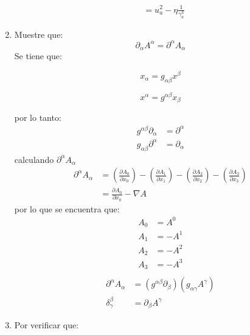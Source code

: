 \documentclass[12pt,letterpaper]{report}
\begin{document}
\begin{enumerate}
\begin{align*}
        & = u_a^2 - \eta \frac{1}{\gamma^3_a}
    \end{align*}
    \item Muestre que:
    \begin{equation*}
        \partial_\alpha A^\alpha = \partial^\alpha A_\alpha 
    \end{equation*}
    Se tiene que:\\
    \begin{minipage}{0.5\linewidth}
        \begin{equation*}
            x_\alpha = g_{\alpha \beta} x^\beta 
        \end{equation*}
    \end{minipage}
    \begin{minipage}{0.5\linewidth}
        \begin{equation*}
            x^\alpha = g^{\alpha \beta}x_\beta
        \end{equation*}
    \end{minipage}
    por lo tanto: 
    \begin{align*}
        g^{\alpha \beta}\partial_\alpha &= \partial^\alpha \\
        g_{\alpha \beta}\partial^\alpha &= \partial_\alpha 
    \end{align*}
    calculando $\partial^\alpha A_\alpha$
    \begin{align*}
        \partial^\alpha A_\alpha &= \left(\frac{\partial A_0}{\partial x_0} \right)-\left(\frac{\partial A_1}{\partial x_1} \right)-\left(\frac{\partial A_2}{\partial x_2} \right)-\left(\frac{\partial A_3}{\partial x_3}\right)\\
        & = \frac{\partial A_0}{\partial x_0} - \nabla A
    \end{align*}
    por lo que se encuentra que:
    \begin{align*}
        A_0&=A^0 \\ A_1&=-A^1 \\ A_2&=-A^2 \\ A_3&=-A^3 \\
    \end{align*}
    \begin{align*}
        \partial^\alpha A_\alpha &= (g^{\alpha \beta}\partial_\beta)(g_{\alpha \gamma}A^\gamma)\\
        \delta^\beta_\gamma &= \partial_\beta A^\gamma
    \end{align*}
    \item Por verificar que:
    \begin{equation*}

\end{equation*}
\end{enumerate}
\end{document}
